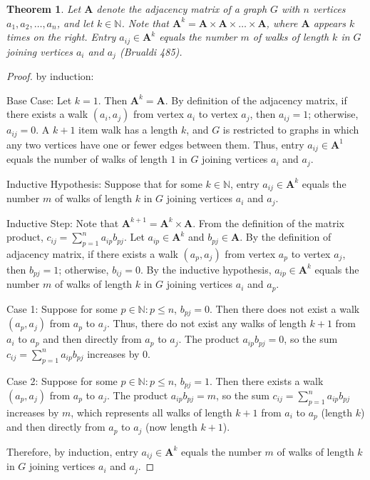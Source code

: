 \documentclass[12pt]{amsart}
\newtheorem{thm}{Theorem}[section]
\theoremstyle{definition}
\theoremstyle{remark}
\numberwithin{equation}{section}
\newcommand{\N}{\mathbb{N}}
\begin{document}
\begin{thm}
Let $\mathbf{A}$ denote the adjacency matrix of a graph $G$ with $n$ vertices $a_1, a_2, \ldots, a_n$, and let $k \in \N$. Note that $\mathbf{A}^k = \mathbf{A} \times \mathbf{A} \times \ldots \times \mathbf{A}$, where $\mathbf{A}$ appears $k$ times on the right. Entry $ a_{ij} \in \mathbf{A}^k$ equals the number $m$ of walks of length $k$ in $G$ joining vertices $a_i$ and $a_j$ (Brualdi 485).
\end{thm}

\begin{proof}
by induction:

Base Case: Let $k = 1$. Then $\mathbf{A}^k = \mathbf{A}$. By definition of the adjacency matrix, if there exists a walk $(a_i, a_j)$ from vertex $a_i$ to vertex $a_j$, then $a_{ij} = 1$; otherwise, $a_{ij} = 0$. A $k+1$ item walk has a length $k$, and $G$ is restricted to graphs in which any two vertices have one or fewer edges between them. Thus, entry $a_{ij} \in \mathbf{A}^1$ equals the number of walks of length $1$ in $G$ joining vertices $a_i$ and $a_j$.

Inductive Hypothesis: Suppose that for some $k \in \N$, entry $ a_{ij} \in \mathbf{A}^k$ equals the number $m$ of walks of length $k$ in $G$ joining vertices $a_i$ and $a_j$.

Inductive Step: Note that $\mathbf{A}^{k+1} = \mathbf{A}^k \times \mathbf{A}$. From the definition of the matrix product, $c_{ij} = \sum_{p=1}^n a_{ip} b_{pj}$. Let $a_{ip} \in \mathbf{A}^k$ and $b_{pj} \in \mathbf{A}$. By the definition of adjacency matrix, if there exists a walk $(a_p, a_j)$ from vertex $a_p$ to vertex $a_j$, then $b_{pj} = 1$; otherwise, $b_{ij} = 0$. By the inductive hypothesis, $a_{ip} \in \mathbf{A}^k$ equals the number $m$ of walks of length $k$ in $G$ joining vertices $a_i$ and $a_p$.

Case 1: Suppose for some $p \in \N : p \le n$, $b_{pj} = 0$. Then there does not exist a walk $(a_p, a_j)$ from $a_p$ to $a_j$. Thus, there do not exist any walks of length $k+1$ from $a_i$ to $a_p$ and then directly from $a_p$ to $a_j$. The product $a_{ip} b_{pj} = 0$, so the sum $c_{ij} = \sum_{p=1}^n a_{ip} b_{pj}$ increases by $0$.

Case 2: Suppose for some $p \in \N : p \le n$, $b_{pj} = 1$. Then there exists a walk $(a_p, a_j)$ from $a_p$ to $a_j$. The product $a_{ip} b_{pj} = m$, so the sum $c_{ij} = \sum_{p=1}^n a_{ip} b_{pj}$ increases by $m$, which represents all walks of length $k+1$ from $a_i$ to $a_p$ (length $k$) and then directly from $a_p$ to $a_j$ (now length $k+1$).

Therefore, by induction, entry $a_{ij} \in \mathbf{A}^k$ equals the number $m$ of walks of length $k$ in $G$ joining vertices $a_i$ and $a_j$.
\end{proof}
\end{document}
